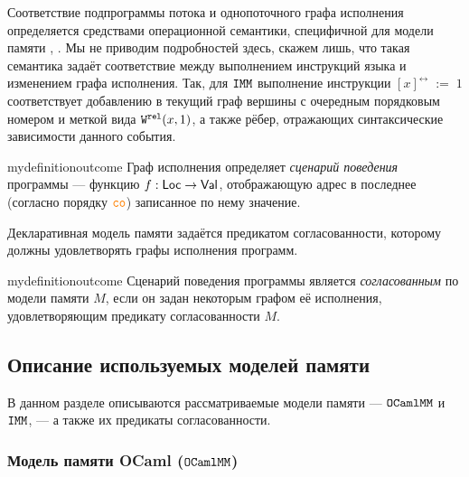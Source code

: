Соответствие подпрограммы потока и однопоточного графа исполнения определяется средствами операционной семантики, специфичной для модели памяти \cite{omm}, \cite{imm}. Мы не приводим подробностей здесь, скажем лишь, что такая семантика задаёт соответствие между выполнением инструкций языка и изменением графа исполнения. Так, для $\mathtt{IMM}$ выполнение инструкции $[x]^{\rel}\;:=\;1$ соответствует добавлению в текущий граф вершины с очередным порядковым номером и меткой вида ${\mathtt{W}}^{\mathtt{rel}}(x, 1)$, а также рёбер, отражающих синтаксические зависимости данного события.

\begin{restatable}{mydefinition}{outcome}
  \label{definition:outcome-def}
  Граф исполнения определяет \emph{сценарий поведения} программы --- функцию ${f: \mathsf{Loc} \to \mathsf{Val}}$, отображающую адрес в последнее (согласно порядку $\lCO$) записанное по нему значение. 
\end{restatable}

Декларативная модель памяти задаётся предикатом согласованности, которому должны удовлетворять графы исполнения программ.
\begin{restatable}{mydefinition}{outcome}
  Сценарий поведения программы является \emph{согласованным} по модели памяти $M$, если он задан некоторым графом её исполнения, удовлетворяющим предикату согласованности $M$.
\end{restatable}  

\subsection{Описание используемых моделей памяти}

В данном разделе описываются рассматриваемые модели памяти ---  $\mathtt{OCaml}\allowbreak \mathtt{MM}$ и $\mathtt{IMM}$, --- а также их предикаты
согласованности.

\subsubsection{Модель памяти OCaml ($\mathtt{OCaml}\allowbreak \mathtt{MM}$)}


